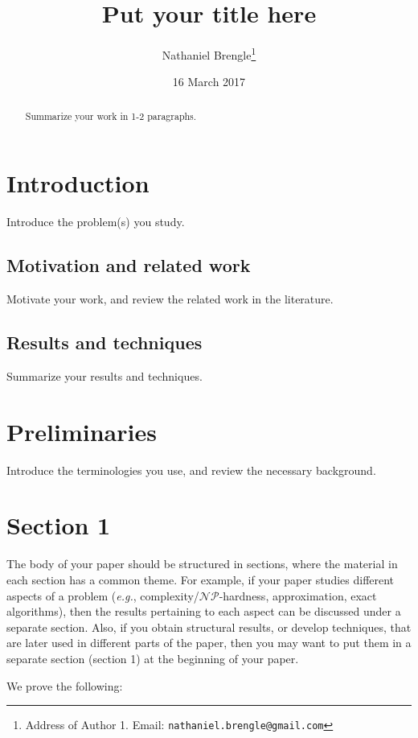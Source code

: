 \documentclass[11pt]{article}
\date{16 March 2017}
\title{Put your title here}
\author{{\sc Nathaniel Brengle}\thanks{Address of Author 1. Email: {\tt nathaniel.brengle@gmail.com}}}
\newcommand{\NP}{\mbox{$\mathcal{NP}$}}
\def\eg{{\em e.g.}}
\begin{document}
\maketitle

\begin{abstract}
Summarize your work in 1-2 paragraphs.

\end{abstract}



\section{Introduction} \label{sec:intro}
Introduce the problem(s) you study.

\subsection{Motivation and related work}
\label{subsec:motive}
Motivate your work, and review the related work in the literature.

\subsection{Results and techniques}
\label{subsec:results}
Summarize your results and techniques.

\section{Preliminaries}
\label{sec:prelim}
Introduce the terminologies you use, and review the necessary background.

\section{Section 1}
\label{subsec:structural}
The body of your paper should be structured in sections, where the material in each section has a common theme. For example, if your paper studies different aspects of a problem (\eg, complexity/\NP-hardness, approximation, exact algorithms), then the results pertaining to each aspect can be discussed under a separate section. Also, if you obtain structural results, or develop techniques, that are later used in different parts of the paper, then you may want to put them in a separate section (section 1) at the beginning of your paper.


We prove the following:
\end{document}
